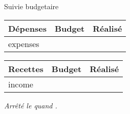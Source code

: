 \documentclass[10 pt]{report}
\begin{document}
\centerline{\Huge Suivie budgetaire}

\begin{minipage}[t]{.47\textwidth}
  \vspace{0pt}
  \begin{tabu} to \linewidth {|X|r|r|}
    \hline
    Dépenses & Budget & Réalisé \\
    \hline
    \hline
    {{expenses}}
    \hline
  \end{tabu}
  \vfill
\end{minipage}
\begin{minipage}[t]{.47\textwidth}
  \vspace{0pt}
  \begin{tabu} to \linewidth {|X|r|r|}
    \hline
    Recettes & Budget & Réalisé \\
    \hline
    \hline
    {{income}}
    \hline
  \end{tabu}
  \vfill
\end{minipage}

\textit{\small Arrêté le {{ quand }}.}
\end{document}
